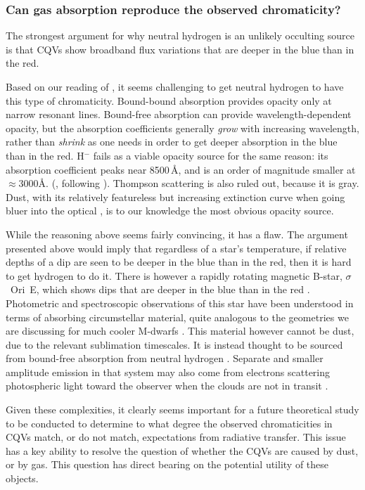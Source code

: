 \documentclass[11pt,twocolumn,tighten]{aastex63}
\begin{document}
\subsubsection{Can gas absorption reproduce the observed chromaticity?}
The strongest argument for why neutral hydrogen is an unlikely
occulting source is that CQVs show broadband flux variations that are
deeper in the blue than in the red.

Based on our reading of \citet[][Ch.~8]{1992oasp.book.....G}, it seems
challenging to get neutral hydrogen to have this type of
chromaticity.  Bound-bound absorption provides opacity only at narrow
resonant lines.  Bound-free absorption can provide
wavelength-dependent opacity, but the absorption coefficients
generally {\it grow} with increasing wavelength, rather than {\it
shrink} as one needs in order to get deeper absorption in the blue
than in the red.  H$^-$  fails as a viable opacity source for the same
reason: its absorption coefficient peaks near 8500\,\AA, and is an
order of magnitude smaller at $\approx$3000\AA.
(\citealt{1992oasp.book.....G}, following \citealt{1979MNRAS.187P..59W}).
Thompson scattering is also ruled out, because it is gray.  Dust, with
its relatively featureless but increasing extinction curve when going
bluer into the optical \citep{1989ApJ...345..245C}, is to our
knowledge the most obvious opacity source.

While the reasoning above seems fairly convincing, it has a
flaw.  The argument presented above would imply that regardless of a
star's temperature, if relative depths of a dip are seen to be deeper
in the blue than in the red, then it is hard to get hydrogen to do it.
There is however a rapidly rotating magnetic B-star, $\sigma$~Ori~E,
which shows dips that are deeper in the blue than in the red
\citep{1977ApJ...216L..31H}.  Photometric and spectroscopic
observations of this star have been understood in terms of absorbing
circumstellar material, quite analogous to the geometries we are
discussing for much cooler M-dwarfs \citep{2005ApJ...630L..81T}.  This
material however cannot be dust, due to the relevant sublimation
timescales.  It is instead thought to be sourced from bound-free
absorption from neutral hydrogen \citep{2005ApJ...630L..81T}.
Separate and smaller amplitude emission in that system may also come
from electrons scattering photospheric light toward the observer when
the clouds are not in transit \citep{2022MNRAS.511.4815B}.

Given these complexities, it clearly seems important for a future
theoretical study to be conducted to determine to what degree the
observed chromaticities in CQVs match, or do not match, expectations
from radiative transfer.  This issue has a key ability to resolve the
question of whether the CQVs are caused by dust, or by gas.  This
question has direct bearing on the potential utility of these objects.
\end{document}
